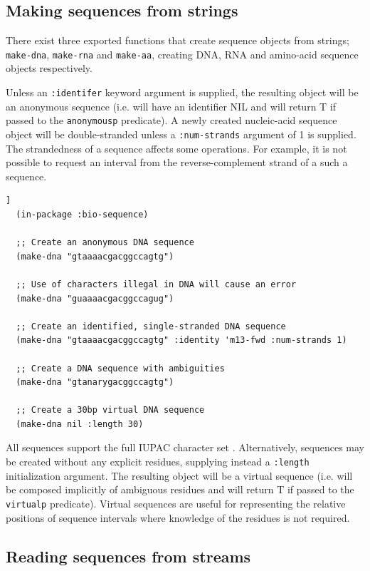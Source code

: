 \documentclass[a4paper, 12pt]{article}
\begin{document}
\subsection{Making sequences from strings}
\label{sec:make-bioseq-str}

There exist three exported functions that create sequence objects from
strings; \lstinline!make-dna!, \lstinline!make-rna! and
\lstinline!make-aa!, creating DNA, RNA and amino-acid sequence objects
respectively.

Unless an \lstinline!:identifer! keyword argument is supplied, the
resulting object will be an anonymous sequence (i.e. will have an
identifier NIL and will return T if passed to the
\lstinline!anonymousp! predicate). A newly created nucleic-acid
sequence object will be double-stranded unless a
\lstinline!:num-strands! argument of 1 is supplied. The strandedness
of a sequence affects some operations. For example, it is not possible
to request an interval from the reverse-complement strand of a such a
sequence.

\begin{lstlisting}[caption={Making DNA sequences from strings},
  label=lst:make-dnaseq-string,float=[tbph]]
  (in-package :bio-sequence)
  
  ;; Create an anonymous DNA sequence
  (make-dna "gtaaaacgacggccagtg")
  
  ;; Use of characters illegal in DNA will cause an error
  (make-dna "guaaaacgacggccagug")

  ;; Create an identified, single-stranded DNA sequence 
  (make-dna "gtaaaacgacggccagtg" :identity 'm13-fwd :num-strands 1)

  ;; Create a DNA sequence with ambiguities
  (make-dna "gtanarygacggccagtg")

  ;; Create a 30bp virtual DNA sequence
  (make-dna nil :length 30)
\end{lstlisting}

All sequences support the full IUPAC character set
\cite{PMID:2582368}. Alternatively, sequences may be created without
any explicit residues, supplying instead a \lstinline!:length!
initialization argument. The resulting object will be a virtual
sequence (i.e. will be composed implicitly of ambiguous residues and
will return T if passed to the \lstinline!virtualp!
predicate). Virtual sequences are useful for representing the relative
positions of sequence intervals where knowledge of the residues is not
required.

\subsection{Reading sequences from streams}
\label{sec:read-bioseq-stream}
\end{document}
